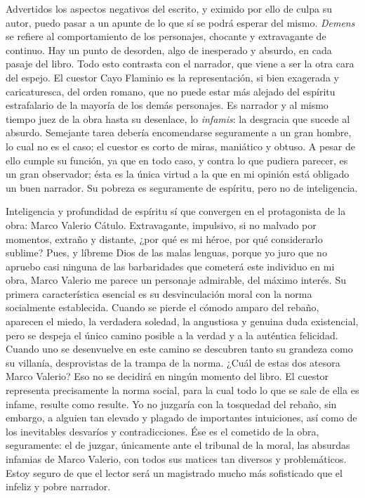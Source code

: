 \documentclass[11pt,openany]{book}
\begin{document}
Advertidos los aspectos negativos del escrito, y eximido por ello de culpa su autor, puedo pasar a un apunte de lo que sí se podrá esperar del mismo. \textit{Demens} se refiere al comportamiento de los personajes, chocante y extravagante de continuo. Hay un punto de desorden, algo de inesperado y absurdo, en cada pasaje del libro. Todo esto contrasta con el narrador, que viene a ser la otra cara del espejo. El cuestor Cayo Flaminio es la representación, si bien exagerada y caricaturesca, del orden romano, que no puede estar más alejado del espíritu estrafalario de la mayoría de los demás personajes. Es narrador y al mismo tiempo juez de la obra hasta su desenlace, lo \textit{infamis}: la desgracia que sucede al absurdo. Semejante tarea debería encomendarse seguramente a un gran hombre, lo cual no es el caso; el cuestor es corto de miras, maniático y obtuso. A pesar de ello cumple su función, ya que en todo caso, y contra lo que pudiera parecer, es un gran observador; ésta es la única virtud a la que en mi opinión está obligado un buen narrador. Su pobreza es seguramente de espíritu, pero no de inteligencia. 

Inteligencia y profundidad de espíritu sí que convergen en el protagonista de la obra: Marco Valerio Cátulo. Extravagante, impulsivo, si no malvado por momentos, extraño y distante, ¿por qué es mi héroe, por qué considerarlo sublime? Pues, y líbreme Dios de las malas lenguas, porque yo juro que no apruebo casi ninguna de las barbaridades que cometerá este individuo en mi obra, Marco Valerio me parece un personaje admirable, del máximo interés. Su primera característica esencial es su desvinculación moral con la norma socialmente establecida. Cuando se pierde el cómodo amparo del rebaño, aparecen el miedo, la verdadera soledad, la angustiosa y genuina duda existencial, pero se despeja el único camino posible a la verdad y a la auténtica felicidad. Cuando uno se desenvuelve en este camino se descubren tanto su grandeza como su villanía, desprovistas de la trampa de la norma. ¿Cuál de estas dos atesora Marco Valerio? Eso no se decidirá en ningún momento del libro. El cuestor representa precisamente la norma social, para la cual todo lo que se sale de ella es infame, resulte como resulte. Yo no juzgaría con la tosquedad del rebaño, sin embargo, a alguien tan elevado y plagado de importantes intuiciones, así como de los inevitables desvaríos y contradicciones. Ése es el cometido de la obra, seguramente: el de juzgar, únicamente ante el tribunal de la moral, las absurdas infamias de Marco Valerio, con todos sus matices tan diversos y problemáticos. Estoy seguro de que el lector será un magistrado mucho más sofisticado que el infeliz y pobre narrador. 
\end{document}
